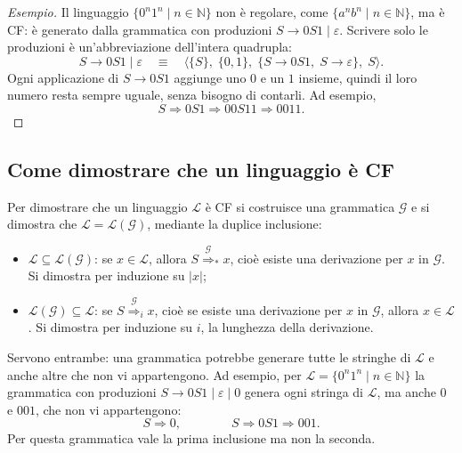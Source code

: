 \documentclass[a4paper, 11pt, oneside]{book}
\theoremstyle{formale}
\newenvironment{esempio}
    {\begin{proof}[\textit{Esempio}]\renewcommand{\qedsymbol}{$\diamond$}}
    {\end{proof}}
\begin{document}
    \begin{esempio}
        Il linguaggio $\{0^n 1^n \mid n \in \mathbb{N}\}$ non \`e regolare, come
        $\{a^n b^n \mid n \in \mathbb{N}\}$, ma \`e CF: \`e generato dalla grammatica con
        produzioni $S \to 0S1 \mid \varepsilon$. Scrivere solo le produzioni \`e
        un'abbreviazione dell'intera quadrupla:
        \begin{equation*}
            S \to 0S1 \mid \varepsilon
            \quad\equiv\quad
            \langle \{S\},\; \{0, 1\},\; \{S \to 0S1,\; S \to \varepsilon\},\; S \rangle.
        \end{equation*}
        Ogni applicazione di $S \to 0S1$ aggiunge uno $0$ e un $1$ insieme, quindi il loro
        numero resta sempre uguale, senza bisogno di contarli. Ad esempio,
        \begin{equation*}
            S \Rightarrow 0S1 \Rightarrow 00S11 \Rightarrow 0011.
        \end{equation*}
    \end{esempio}

    \subsection{Come dimostrare che un linguaggio \`e CF}
    \label{sec:dimostrare-cf}
    Per dimostrare che un linguaggio $\mathcal{L}$ \`e CF si costruisce una grammatica
    $\mathcal{G}$ e si dimostra che $\mathcal{L} = \mathcal{L}(\mathcal{G})$, mediante la
    duplice inclusione:
    \begin{itemize}
        \item $\mathcal{L} \subseteq \mathcal{L}(\mathcal{G})$: se $x \in \mathcal{L}$,
            allora $S \overset{\mathcal{G}}{\Rightarrow}_* x$, cio\`e esiste una derivazione
            per $x$ in $\mathcal{G}$. Si dimostra per induzione su $|x|$;
        \item $\mathcal{L}(\mathcal{G}) \subseteq \mathcal{L}$: se
            $S \overset{\mathcal{G}}{\Rightarrow}_i x$, cio\`e se esiste una derivazione per
            $x$ in $\mathcal{G}$, allora $x \in \mathcal{L}$. Si dimostra per induzione su
            $i$, la lunghezza della derivazione.
    \end{itemize}
    Servono entrambe: una grammatica potrebbe generare tutte le stringhe di $\mathcal{L}$ e
    anche altre che non vi appartengono. Ad esempio, per
    $\mathcal{L} = \{0^n 1^n \mid n \in \mathbb{N}\}$ la grammatica con produzioni
    $S \to 0S1 \mid \varepsilon \mid 0$ genera ogni stringa di $\mathcal{L}$, ma anche $0$
    e $001$, che non vi appartengono:
    \begin{equation*}
        S \Rightarrow 0,
        \qquad\qquad
        S \Rightarrow 0S1 \Rightarrow 001.
    \end{equation*}
    Per questa grammatica vale la prima inclusione ma non la seconda.
\end{document}

